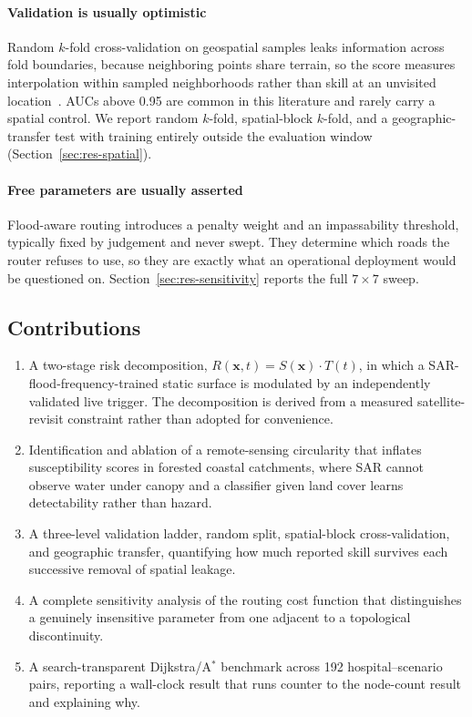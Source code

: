 \documentclass[10pt,twocolumn]{article}
\newcommand{\Sx}{S(\mathbf{x})}
\newcommand{\Tt}{T(t)}
\newcommand{\Rxt}{R(\mathbf{x},t)}
\begin{document}
\paragraph{Validation is usually optimistic}
Random $k$-fold cross-validation on geospatial samples leaks information across
fold boundaries, because neighboring points share terrain, so the score measures
interpolation within sampled neighborhoods rather than skill at an unvisited
location~\citep{roberts2017,ploton2020,meyer2021}. AUCs above 0.95 are common in
this literature and rarely carry a spatial control. We report random $k$-fold,
spatial-block $k$-fold, and a geographic-transfer test with training entirely
outside the evaluation window (Section~\ref{sec:res-spatial}).

\paragraph{Free parameters are usually asserted}
Flood-aware routing introduces a penalty weight and an impassability threshold,
typically fixed by judgement and never swept. They determine which roads the
router refuses to use, so they are exactly what an operational deployment would
be questioned on. Section~\ref{sec:res-sensitivity} reports the full
$7\times7$ sweep.

\subsection{Contributions}
\begin{enumerate}
\itemsep2pt
\item A two-stage risk decomposition, $\Rxt=\Sx\cdot\Tt$, in which a
      SAR-flood-frequency-trained static surface is modulated by an independently
      validated live trigger. The decomposition is derived from a measured
      satellite-revisit constraint rather than adopted for convenience.
\item Identification and ablation of a remote-sensing circularity that inflates
      susceptibility scores in forested coastal catchments, where SAR cannot
      observe water under canopy and a classifier given land cover learns
      detectability rather than hazard.
\item A three-level validation ladder, random split, spatial-block
      cross-validation, and geographic transfer, quantifying how much reported
      skill survives each successive removal of spatial leakage.
\item A complete sensitivity analysis of the routing cost function that
      distinguishes a genuinely insensitive parameter from one adjacent to a
      topological discontinuity.
\item A search-transparent Dijkstra/A$^\ast$ benchmark across 192
      hospital--scenario pairs, reporting a wall-clock result that runs counter to
      the node-count result and explaining why.
\end{enumerate}
\end{document}
